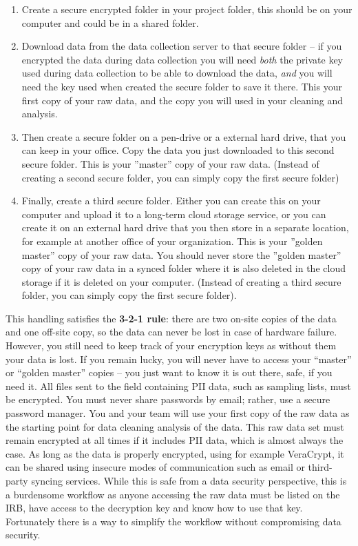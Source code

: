 \begin{enumerate}
	\item Create a secure encrypted folder in your project folder, this should be on
	your computer and could be in a shared folder.
	\item Download data from the data collection server to that secure folder -- if
	you encrypted the data during data collection you will need \textit{both} the
	private key used during data collection to be able to download the data, \textit{and}
	you will need the key used when created the secure folder to save it there. This
	your first copy of your raw data, and the copy you will used in your cleaning and analysis.
	\item Then create a secure folder on a pen-drive or a external hard drive, that you
	can keep in your office. Copy the data you just downloaded to this second secure
	folder. This is your ''master'' copy of your raw data. (Instead of creating a second
	secure folder, you can simply copy the first secure folder)
	\item Finally, create a third secure folder. Either you can create this on your
	computer and upload it to a long-term cloud storage service, or you can create it on
	an external hard drive that you then store in a separate location, for example at
	another office of your organization. This is your ''golden master'' copy of your raw
	data. You should never store the ''golden master'' copy of your raw data in a synced
	folder where it is also deleted in the cloud storage if it is deleted on your computer.
	(Instead of creating a third secure folder, you can simply copy the first secure folder).
\end{enumerate}

\noindent This handling satisfies the \textbf{3-2-1 rule}: there are
two on-site copies of the data and one off-site copy, so the data can never
be lost in case of hardware failure. However, you still
need to keep track of your encryption keys as without them your data is lost. 
If you remain lucky, you will never have to access your ``master'' or ``golden master''
copies -- you just want to know it is out there, safe, if you need it.
All files sent to the field containing PII data, such as sampling lists, must be encrypted.
You must never share passwords by email; rather, use a secure password manager.
You and your team will use your first copy of the raw data as the starting point for data 
cleaning analysis of the data. This raw data set must remain encrypted at all times if it 
includes PII data, which is almost always the case. As long as the data is properly encrypted,
using for example VeraCrypt, it can be shared using insecure modes of communication such as
email or third-party syncing services. While this is safe from a data security perspective, 
this is a burdensome workflow as anyone accessing the raw data must be listed on the IRB, 
have access to the decryption key and know how to use that key. Fortunately there is a way 
to simplify the workflow without compromising data security.

